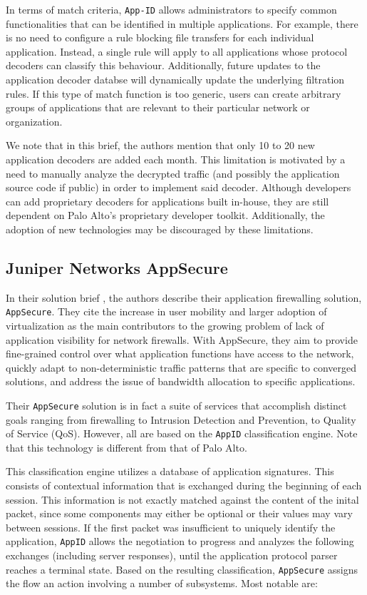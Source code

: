 In terms of match criteria, \texttt{App-ID} allows administrators to specify
common functionalities that can be identified in multiple applications. For
example, there is no need to configure a rule blocking file transfers for each
individual application. Instead, a single rule will apply to all applications
whose protocol decoders can classify this behaviour. Additionally, future updates
to the application decoder databse will dynamically update the underlying
filtration rules. If this type of match function is too generic, users can create
arbitrary groups of applications that are relevant to their particular network or
organization.

We note that in this brief, the authors mention that only 10 to 20 new application
decoders are added each month. This limitation is motivated by a need to manually
analyze the decrypted traffic (and possibly the application source code if public)
in order to implement said decoder. Although developers can add proprietary decoders
for applications built in-house, they are still dependent on Palo Alto's
proprietary developer toolkit. Additionally, the adoption of new technologies
may be discouraged by these limitations.

\subsection{Juniper Networks AppSecure}

In their solution brief \cite{juniper2020appsecure}, the authors describe their
application firewalling solution, \texttt{AppSecure}. They cite the increase in
user mobility and larger adoption of virtualization as the main contributors
to the growing problem of lack of application visibility for network firewalls.
With AppSecure, they aim to provide fine-grained control over what application
functions have access to the network, quickly adapt to non-deterministic traffic
patterns that are specific to converged solutions, and address the issue of
bandwidth allocation to specific applications.

Their \texttt{AppSecure} solution is in fact a suite of services that accomplish
distinct goals ranging from firewalling to Intrusion Detection and Prevention,
to Quality of Service (QoS). However, all are based on the \texttt{AppID}
classification engine. Note that this technology is different from that of Palo Alto.

This classification engine utilizes a database of application signatures. This
consists of contextual information that is exchanged during the beginning of
each session. This information is not exactly matched against the content of
the inital packet, since some components may either be optional or their values
may vary between sessions. If the first packet was insufficient to uniquely
identify the application, \texttt{AppID} allows the negotiation to progress and
analyzes the following exchanges (including server responses), until the
application protocol parser reaches a terminal state. Based on the resulting
classification, \texttt{AppSecure} assigns the flow an action involving a number
of subsystems. Most notable are:

